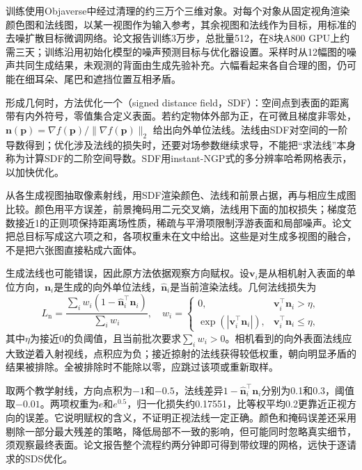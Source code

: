 训练使用Objaverse中经过清理的约三万个三维对象。对每个对象从固定视角渲染颜色图和法线图，以某一视图作为输入参考，其余视图和法线作为目标，用标准的去噪扩散目标微调网络。论文报告训练3万步，总批量512，在8块A800 GPU上约需三天；训练沿用初始化模型的噪声预测目标与优化器设置。采样时从12幅图的噪声共同生成结果，未观测的背面由生成先验补充。六幅看起来各自合理的图，仍可能在细耳朵、尾巴和遮挡位置互相矛盾。

形成几何时，方法优化一个（signed distance field，SDF）：空间点到表面的距离带有内外符号，零值集合定义表面。若约定物体外部为正，在可微且梯度非零处，
$\bm n(\bm p)=\nabla f(\bm p)/\lVert\nabla f(\bm p)\rVert_2$
给出向外单位法线。法线由SDF对空间的一阶导数得到；优化涉及法线的损失时，还要对场参数继续求导，不能把“求法线”本身称为计算SDF的二阶空间导数。SDF用instant-NGP式的多分辨率哈希网格表示，以加快优化。

从各生成视图抽取像素射线，用SDF渲染颜色、法线和前景占据，再与相应生成图比较。颜色用平方误差，前景掩码用二元交叉熵，法线用下面的加权损失；梯度范数接近1的正则项保持距离场性质，稀疏与平滑项限制浮游表面和局部噪声。论文把总目标写成这六项之和，各项权重未在文中给出。这些是对生成多视图的融合，不是把六张图直接粘成六面体。

生成法线也可能错误，因此原方法依据观察方向赋权。设$\bm v_i$是从相机射入表面的单位方向，$\bm n_i$是生成的向外单位法线，$\widehat{\bm n}_i$是当前渲染法线。几何法线损失为
\begin{equation}
 L_{\mathrm n}
 =\frac{\sum_i w_i(1-\widehat{\bm n}_i^\top\bm n_i)}
         {\sum_i w_i},
 \quad
 w_i=
 \begin{cases}
  0,&\bm v_i^\top\bm n_i>\eta,\\
  \exp(|\bm v_i^\top\bm n_i|),&\bm v_i^\top\bm n_i\leq\eta,
 \end{cases}
 \label{eq:vision-wonder-normal}
\end{equation}
其中$\eta$为接近0的负阈值，且当前批次要求$\sum_iw_i>0$。相机看到的向外表面法线应大致逆着入射视线，点积应为负；接近掠射的法线获得较低权重，朝向明显矛盾的结果被排除。全被排除时不能除以零，应跳过该项或重新取样。

取两个教学射线，方向点积为$-1$和$-0.5$，法线差异$1-\widehat{\bm n}_i^\top\bm n_i$分别为0.1和0.3，阈值取$-0.01$。两项权重为$e$和$e^{0.5}$，归一化损失约0.17551，比等权平均0.2更靠近正视方向的误差。它说明赋权的含义，不证明正视法线一定正确。颜色和掩码误差还采用剔除一部分最大残差的策略，降低局部不一致的影响，但可能同时忽略真实细节，须观察最终表面。论文报告整个流程约两分钟即可得到带纹理的网格，远快于逐请求的SDS优化。


